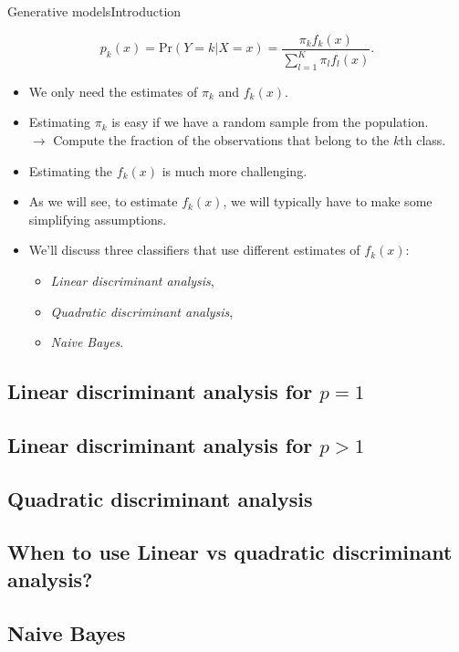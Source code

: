 \begin{frame}{Generative models}{Introduction}

        \begin{equation}\label{eq:bayes}
           p_k(x) =  \text{Pr}(Y=k|X=x) = \frac{\pi_k f_k (x)}{  \sum_{l=1}^K \pi_l f_l(x)  }. 
        \end{equation}

\begin{itemize}
    
    \item We only need the estimates of $\pi_k$ and $f_k(x).$ \pause 
    \item Estimating $\pi_k$ is easy if we have a random sample from the population. \pause  \\ 
    $\rightarrow $ Compute the fraction of the observations that belong to the $k$th class. \pause
    
    \item Estimating the $f_k(x)$ is much more challenging. \pause
    
    \item As we will see, to estimate $f_k(x)$, we will typically have to make some simplifying assumptions. \pause

    \item We'll discuss three classifiers that use diﬀerent
estimates of $f_k(x)$: \pause \\ 
    \begin{itemize}
        \item \textit{Linear discriminant analysis}, \pause 
        \item \textit{Quadratic discriminant analysis}, \pause
        \item \textit{Naive Bayes}.
    \end{itemize}
        
\end{itemize}
    
\end{frame}


\subsection{Linear discriminant analysis for $p = 1$}



\subsection{Linear discriminant analysis for $p > 1$}



\subsection{Quadratic discriminant analysis}


\subsection{When to use Linear vs quadratic discriminant analysis?}



\subsection{Naive Bayes}

